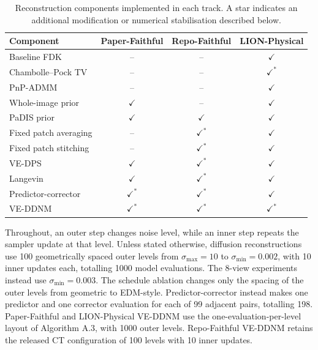 \begin{table}[ht]
  \centering
  \caption[Reconstruction components by implementation track.]{Reconstruction components implemented in each track. A star indicates an additional modification or numerical stabilisation described below.}
  \label{tab:methods_by_implementation}
  \begin{tabular}{lccc}
  \hline
  \textbf{Component} & \textbf{Paper-Faithful} & \textbf{Repo-Faithful} & \textbf{LION-Physical} \\
  \hline
  Baseline FDK              & --             & --             & $\checkmark$ \\
  Chambolle--Pock TV        & --             & --             & $\checkmark^*$ \\
  PnP-ADMM                  & --             & --             & $\checkmark$ \\
  Whole-image prior         & $\checkmark$ & --             & $\checkmark$ \\
  PaDIS prior               & $\checkmark$ & $\checkmark$ & $\checkmark$ \\
  Fixed patch averaging     & --             & $\checkmark^*$ & $\checkmark$ \\
  Fixed patch stitching     & --             & $\checkmark^*$ & $\checkmark$ \\
  VE-DPS                    & $\checkmark$ & $\checkmark^*$ & $\checkmark$ \\
  Langevin                  & $\checkmark$ & $\checkmark^*$ & $\checkmark$ \\
  Predictor-corrector       & $\checkmark^*$ & $\checkmark^*$ & $\checkmark$ \\
  VE-DDNM                   & $\checkmark^*$ & $\checkmark^*$ & $\checkmark^*$ \\
  \hline
  \end{tabular}
\end{table}

Throughout, an outer step changes noise level, while an inner step repeats the sampler update at that level. Unless stated otherwise, diffusion reconstructions use 100 geometrically spaced outer levels from $\sigma_{\max}=10$ to $\sigma_{\min}=0.002$, with 10 inner updates each, totalling 1000 model evaluations. The 8-view experiments instead use $\sigma_{\min}=0.003$. The schedule ablation changes only the spacing of the outer levels from geometric to EDM-style. Predictor-corrector instead makes one predictor and one corrector evaluation for each of 99 adjacent pairs, totalling 198. Paper-Faithful and LION-Physical VE-DDNM use the one-evaluation-per-level layout of Algorithm A.3, with 1000 outer levels. Repo-Faithful VE-DDNM retains the released CT configuration of 100 levels with 10 inner updates.

